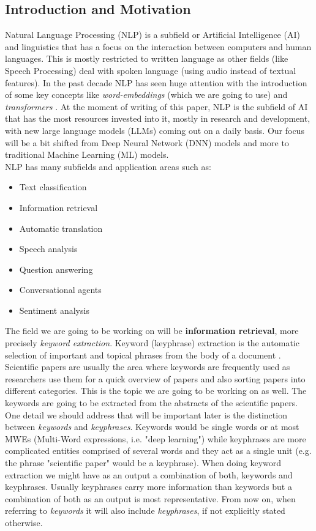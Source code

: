 \documentclass[12pt]{article}
\numberwithin{equation}{section}
\begin{document}
\begin{spacing}{1.5}
	\section{Introduction and Motivation}
	Natural Language Processing (NLP) is a subfield or Artificial Intelligence (AI) and linguistics that has a focus on the interaction between computers and human languages. This is mostly restricted to written language as other fields (like Speech Processing) deal with spoken language (using audio instead of textual features). In the past decade NLP has seen huge attention with the introduction of some key concepts like \textit{word-embeddings} \cite{word-embedding-survey} (which we are going to use) and \textit{transformers} \cite{transformers-survey}. At the moment of writing of this paper, NLP is the subfield of AI that has the most resources invested into it, mostly in research and development, with new large language models (LLMs) coming out on a daily basis. Our focus will be a bit shifted from Deep Neural Network (DNN) models and more to traditional Machine Learning (ML) models. \\
	NLP has many subfields and application areas such as:
	\begin{itemize}
		\item Text classification
		\item Information retrieval
		\item Automatic translation
		\item Speech analysis 
		\item Question answering
		\item Conversational agents
		\item Sentiment analysis
	\end{itemize} 
	The field we are going to be working on will be \textbf{information retrieval}, more precisely \textit{keyword extraction}. Keyword (keyphrase) extraction is the automatic selection of important and topical phrases from the body of a document \cite{keyword-extraction-0}. Scientific papers are usually the area where keywords are frequently used as researchers use them for a quick overview of papers and also sorting papers into different categories. This is the topic we are going to be working on as well. The keywords are going to be extracted from the abstracts of the scientific papers. One detail we should address that will be important later is the distinction between \textit{keywords} and \textit{keyphrases}. Keywords would be single words or at most MWEs (Multi-Word expressions, i.e. "deep learning") while keyphrases are more complicated entities comprised of several words and they act as a single unit (e.g. the phrase "scientific paper" would be a keyphrase). When doing keyword extraction we might have as an output a combination of both, keywords and keyphrases. Usually keyphrases carry more information than keywords but a combination of both as an output is most representative. From now on, when referring to \textit{keywords} it will also include \textit{keyphrases}, if not explicitly stated otherwise. \\

\end{spacing}
\end{document}
